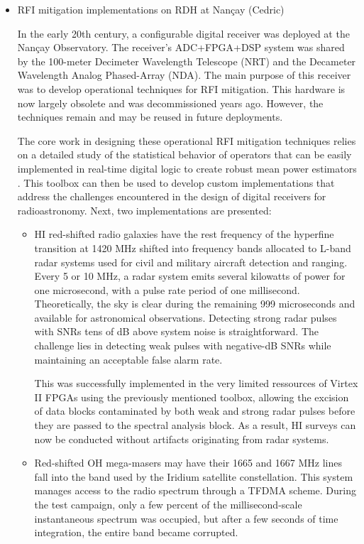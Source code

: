 \begin{itemize}
\item RFI mitigation implementations on RDH at Nançay (Cedric)

In the early 20th century, a configurable digital receiver was deployed at the Nançay Observatory. The receiver's ADC+FPGA+DSP system was shared by the 100-meter Decimeter Wavelength Telescope (NRT) and the Decameter Wavelength Analog Phased-Array (NDA). The main purpose of this receiver was to develop operational techniques for RFI mitigation. This hardware is now largely obsolete and was decommissioned years ago. However, the techniques remain and may be reused in future deployments.

The core work in designing these operational RFI mitigation techniques relies on a detailed study of the statistical behavior of operators that can be easily implemented in real-time digital logic to create robust mean power estimators \cite{dumezviou:tel-00319939}. This toolbox can then be used to develop custom implementations that address the challenges encountered in the design of digital receivers for radioastronomy.  Next, two implementations are presented:

\begin{itemize}
\item HI red-shifted radio galaxies have the rest frequency of the hyperfine transition at 1420 MHz shifted into frequency bands allocated to L-band radar systems used for civil and military aircraft detection and ranging. Every 5 or 10 MHz, a radar system emits several kilowatts of power for one microsecond, with a pulse rate period of one millisecond. Theoretically, the sky is clear during the remaining 999 microseconds and available for astronomical observations. Detecting strong radar pulses with SNRs tens of dB above system noise is straightforward. The challenge lies in detecting weak pulses with negative-dB SNRs while maintaining an acceptable false alarm rate.

This was successfully implemented in the very limited ressources of Virtex II FPGAs using the previously mentioned toolbox, allowing the excision of data blocks contaminated by both weak and strong radar pulses before they are passed to the spectral analysis block. As a result, HI surveys can now be conducted without artifacts originating from radar systems.


\item Red-shifted OH mega-masers may have their 1665 and 1667 MHz lines fall into the band used by the Iridium satellite constellation. This system manages access to the radio spectrum through a TFDMA scheme. During the test campaign, only a few percent of the millisecond-scale instantaneous spectrum was occupied, but after a few seconds of time integration, the entire band became corrupted.


\end{itemize}
\end{itemize}
